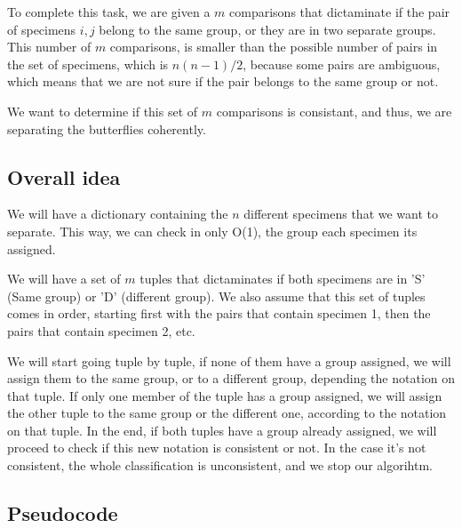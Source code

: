 \documentclass{article}
\begin{document}
To complete this task, we are given a $m$ comparisons that dictaminate if the pair of specimens $i,j$ belong to the same group, or they are in two separate groups. This number of $m$ comparisons, is smaller than the possible number of pairs in the set of specimens, which is $n(n-1)/2$, because some pairs are ambiguous, which means that we are not sure if the pair belongs to the same group or not.

We want to determine if this set of $m$ comparisons is consistant, and thus, we are separating the butterflies coherently.

\subsection*{Overall idea}

We will have a dictionary containing the $n$ different specimens that we want to separate. This way, we can check in only O(1), the group each specimen its assigned.

We will have a set of $m$ tuples that dictaminates if both specimens are in 'S' (Same group) or 'D' (different group). We also assume that this set of tuples comes in order, starting first with the pairs that contain specimen 1, then the pairs that contain specimen 2, etc.

We will start going tuple by tuple, if none of them have a group assigned, we will assign them to the same group, or to a different group, depending the notation on that tuple. If only one member of the tuple has a group assigned, we will assign the other tuple to the same group or the different one, according to the notation on that tuple. In the end, if both tuples have a group already assigned, we will proceed to check if this new notation is consistent or not. In the case it's not consistent, the whole classification is unconsistent, and we stop our algorihtm.

\subsection*{Pseudocode}
\end{document}
